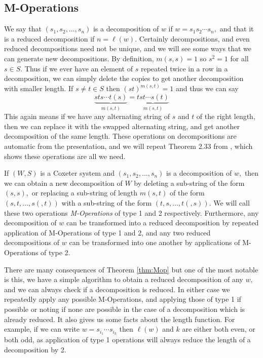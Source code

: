 \documentclass[class=book, crop=false,12 pt]{standalone}
\begin{document}
\subsection{M-Operations}
We say that $(s_1,s_2,\dots,s_n)$ is a decomposition of $w$ if $w=s_1s_2\cdots s_n,$ and that it is a reduced decomposition if $n=\ell(w).$ Certainly decompositions, and even reduced decompositions need not be unique, and we will see some ways that we can generate new decompositions. By definition, $m(s,s)=1$ so $s^2=1$ for all $s\in S.$ Thus if we ever have an element of $s$ repeated twice in a row in a decomposition, we can simply delete the copies to get another decomposition with smaller length. If $s\neq t\in S$ then $(st)^{m(s,t)}=1$ and thus we can say
\[
	\underbrace{sts\cdots t(s)}_{m(s,t)}=\underbrace{tst\cdots s(t)}_{m(s,t)}
\]
This again means if we have any alternating string of $s$ and $t$ of the right length, then we can replace it with the swapped alternating string, and get another decomposition of the same length. These operations on decompositions are automatic from the presentation, and we will repeat Theorem 2.33 from \cite{buildings}, which shows these operations are all we need.

\begin{theorem}
	\label{thm:Mop}
	If $(W,S)$ is a Coxeter system and $(s_1,s_2,\dots,s_n)$ is a decomposition of $w,$ then we can obtain a new decomposition of $W$ by deleting a sub-string of the form $(s,s),$ or replacing a sub-string of length $m(s,t)$ of the form $(s,t,\dots,s(,t))$ with a sub-string of the form $(t,s,\dots,t(,s)).$ We will call these two operations \emph{M-Operations} of type 1 and 2 respectively. Furthermore, any decomposition of $w$ can be transformed into a reduced decomposition by repeated application of M-Operations of type 1 and 2, and any two reduced decompositions of $w$ can be transformed into one another by applications of M-Operations of type 2.
\end{theorem}

There are many consequences of Theorem \ref{thm:Mop} but one of the most notable is this, we have a simple algorithm to obtain a reduced decomposition of any $w,$ and we can always check if a decomposition is reduced. In either case we repeatedly apply any possible M-Operations, and applying those of type 1 if possible or noting if none are possible in the case of a decomposition which is already reduced. It also gives us some facts about the length function. For example, if we can write $w=s_{i_1}\cdots s_{i_k}$ then $\ell(w)$ and $k$ are either both even, or both odd, as application of type 1 operations will always reduce the length of a decomposition by 2.
\end{document}

